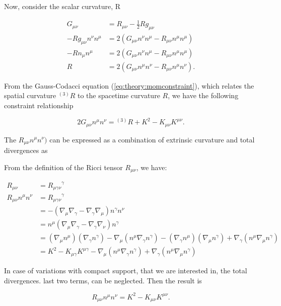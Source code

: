 \documentclass[11pt,a4paper,headinclude=true,DIV=14,BCOR=8mm,chapterprefix,listof=totoc,twoside,openright,abstracton]{scrbook}
\begin{document}
Now, consider the scalar curvature, R

\begin{align}
    G_{\mu\nu} &= R_{\mu\nu} - \frac{1}{2}Rg_{\mu\nu} \\
    -Rg_{\mu\nu}n^{\nu}n^{\mu} &= 2(G_{\mu\nu} n^{\nu}n^{\mu}-R_{\mu\nu}n^{\mu}n^{\mu})\\
    -Rn_{\mu}n^{\mu}& = 2(G_{\mu\nu}n^{\nu}n^{\mu} - R_{\mu\nu}n^{\mu}n^{\mu}) \\
    R &= 2(G_{\mu\nu}n^{\mu}n^{\nu} - R_{\mu\nu}n^{\mu}n^{\nu}).
\end{align}

From the Gauss-Codacci equation (\ref{eq:theory:momconstraint}), which relates the spatial curvature $^{(3)}R$ to the spacetime curvature $R$, we have the following constraint
relationship

\begin{equation}
    2G_{\mu\nu}n^{\mu}n^{\nu} = {^{(3)}R} + K^2 - K_{\mu\nu}K^{\mu\nu}.
\end{equation}

The $R_{\mu\nu}n^{\mu}n^{\nu})$ can be expressed as a combination of extrinsic curvature and total divergences as 

From the definition of the Ricci tensor $R_{\mu\nu}$, we have:

\begin{align}
    R_{\mu\nu} &= {R_{\mu\gamma\nu}}^{\gamma} \\
    R_{\mu\nu}n^{\mu}n^{\nu} &= {R_{\mu\gamma\nu}}^{\gamma} \\
    &= -(\nabla_{\mu}\nabla_{\gamma} - \nabla_{\gamma}\nabla_{\mu})n^{\gamma}n^{\nu} \\
    &= n^{\mu}(\nabla_{\mu}\nabla_{\gamma} - \nabla_{\gamma}\nabla_{\nu})n^{\gamma} \\
    &= (\nabla_{\mu}n^{\mu})(\nabla_{\gamma}n^{\gamma}) - \nabla_{\mu}(n^{\mu}\nabla_{\gamma}n^{\gamma}) - (\nabla_{\gamma}n^{\mu})(\nabla_{\mu}n^{\gamma}) + \nabla_{\gamma}(n^{\mu}\nabla_{\mu}n^{\gamma}) \\
    &= K^2 - K_{\mu\gamma}K^{\mu\gamma} - \nabla_{\mu}(n^{\mu}\nabla_{\gamma}n^{\gamma}) + \nabla_{\gamma}(n^{\mu}\nabla_{\mu}n^{\gamma})
\end{align}

In case of variations with compact support, that we are interested in, the total divergences. last two terms, can be neglected. Then the result is

\begin{equation}
    R_{\mu\nu}n^{\mu}n^{\nu}= K^2 - K_{\mu\nu}K^{\mu\nu}.
    \label{eq:theory:rmunu_as_func_k}
\end{equation}
\end{document}

